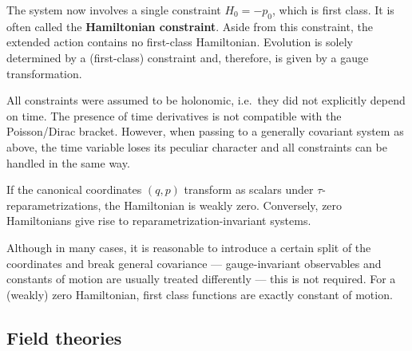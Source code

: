     The system now involves a single constraint $H_0=-p_0$, which is first class. It is often called the \textbf{Hamiltonian constraint}. Aside from this constraint, the extended action contains no first-class Hamiltonian. Evolution is solely determined by a (first-class) constraint and, therefore, is given by a gauge transformation.

    \begin{remark}[Nonholonomicity]
        All constraints were assumed to be holonomic, i.e.~they did not explicitly depend on time. The presence of time derivatives is not compatible with the Poisson/Dirac bracket. However, when passing to a generally covariant system as above, the time variable loses its peculiar character and all constraints can be handled in the same way.
    \end{remark}

    \begin{property}
        If the canonical coordinates $(q,p)$ transform as scalars under $\tau$-reparametrizations, the Hamiltonian is weakly zero. Conversely, zero Hamiltonians give rise to reparametrization-invariant systems.
    \end{property}

    Although in many cases, it is reasonable to introduce a certain split of the coordinates and break general covariance --- gauge-invariant observables and constants of motion are usually treated differently --- this is not required. For a (weakly) zero Hamiltonian, first class functions are exactly constant of motion.

\subsection{Field theories}

